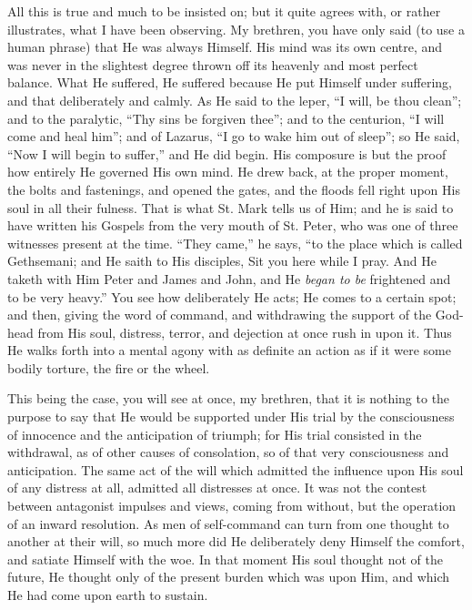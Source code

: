 All this is true and much to be insisted on; but it quite agrees
with, or rather illustrates, what I have been observing. My brethren,
you have only said (to use a human phrase) that He was always Himself.
His mind was its own centre, and was never in the slightest degree
thrown off its heavenly and most perfect balance. What He suffered, He
suffered because He put Himself under suffering, and that deliberately
and calmly. As He said to the leper, ``I will, be thou
clean''; and to the paralytic, ``Thy sins be forgiven
thee''; and to the centurion, ``I will come and heal
him''; and of Lazarus, ``I go to wake him out of sleep'';
so He said, ``Now I will begin to suffer,'' and He did begin.
His composure is but the proof how entirely He governed His own mind.
He drew back, at the proper moment, the bolts and fastenings, and
opened the gates, and the floods fell right upon His soul in all their
fulness. That is what St. Mark tells us of Him; and he is said to have
written his Gospels from the very mouth of St. Peter, who was one of
three witnesses present at the time. ``They came,'' he says,
``to the place which is called Gethsemani; and He saith to His
disciples, Sit you here while I pray. And He taketh with Him Peter and
James and John, and He \emph{began to be} frightened and to be very
heavy.'' You see how deliberately He acts; He comes to a certain
spot; and then, giving the word of command, and withdrawing the
support of the God-head from His soul, distress, terror, and dejection
at once rush in upon it. Thus He walks forth into a mental agony with
as definite an action as if it were some bodily torture, the fire or
the wheel.

This being the case, you will see at once, my brethren, that it is
nothing to the purpose to say that He would be supported under His
trial by the consciousness of innocence and the anticipation of
triumph; for His trial consisted in the withdrawal, as of other causes
of consolation, so of that very consciousness and anticipation. The
same act of the will which admitted the influence upon His soul of any
distress at all, admitted all distresses at once. It was not the
contest between antagonist impulses and views, coming from without,
but the operation of an inward resolution. As men of self-command can
turn from one thought to another at their will, so much more did He
deliberately deny Himself the comfort, and satiate Himself with the
woe. In that moment His soul thought not of the future, He thought
only of the present burden which was upon Him, and which He had come
upon earth to sustain.


